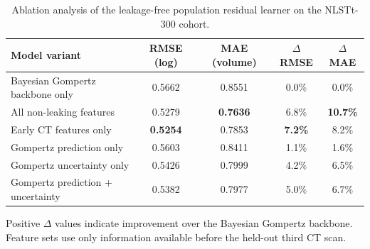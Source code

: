 \begin{table}[t]
\centering
\caption{Ablation analysis of the leakage-free population residual learner on the NLSTt-300 cohort.}
\label{tab:ablation_residual_features}
\begin{tabular}{lcccc}
\toprule
Model variant & RMSE (log) & MAE (volume) & $\Delta$RMSE & $\Delta$MAE \\
\midrule
Bayesian Gompertz backbone only & 0.5662 & 0.8551 & 0.0\% & 0.0\% \\
All non-leaking features & 0.5279 & \textbf{0.7636} & 6.8\% & \textbf{10.7\%} \\
Early CT features only & \textbf{0.5254} & 0.7853 & \textbf{7.2\%} & 8.2\% \\
Gompertz prediction only & 0.5603 & 0.8411 & 1.1\% & 1.6\% \\
Gompertz uncertainty only & 0.5426 & 0.7999 & 4.2\% & 6.5\% \\
Gompertz prediction + uncertainty & 0.5382 & 0.7977 & 5.0\% & 6.7\% \\
\bottomrule
\end{tabular}
\vspace{1mm}
\footnotesize{Positive $\Delta$ values indicate improvement over the Bayesian Gompertz backbone. Feature sets use only information available before the held-out third CT scan.}
\end{table}

